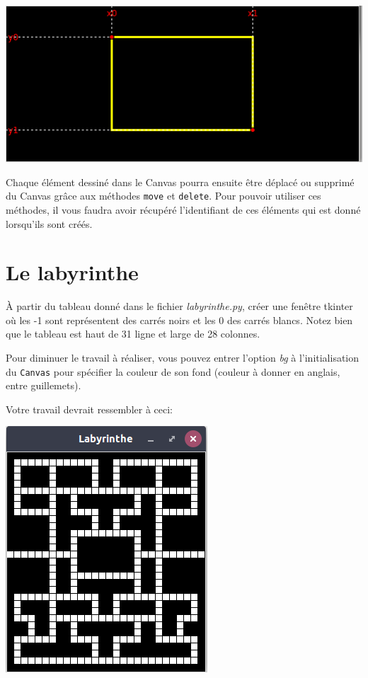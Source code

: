 \documentclass{article}
\begin{document}
\includegraphics[width=.9\linewidth]{./img/coord_canvas.png}

\noindent
Chaque élément dessiné dans le Canvas pourra ensuite être déplacé ou supprimé du Canvas grâce aux méthodes \verb~move~ et \verb~delete~.
Pour pouvoir utiliser ces méthodes, il vous faudra avoir récupéré l'identifiant de ces éléments qui est donné lorsqu'ils sont créés.

\section{Le labyrinthe}
\label{sec-4}

À partir du tableau donné dans le fichier \emph{labyrinthe.py}, créer une fenêtre tkinter où les -1 sont représentent des carrés noirs et les 0 des carrés blancs.
Notez bien que le tableau est haut de 31 ligne et large de 28 colonnes.

\noindent
Pour diminuer le travail à réaliser, vous pouvez entrer l'option \emph{bg} à l'initialisation du \verb~Canvas~ pour spécifier la couleur de son fond (couleur à donner en anglais, entre guillemets).

\noindent
Votre travail devrait ressembler à ceci:

\includegraphics[width=.9\linewidth]{./img/labyrinthe.png}
\end{document}
